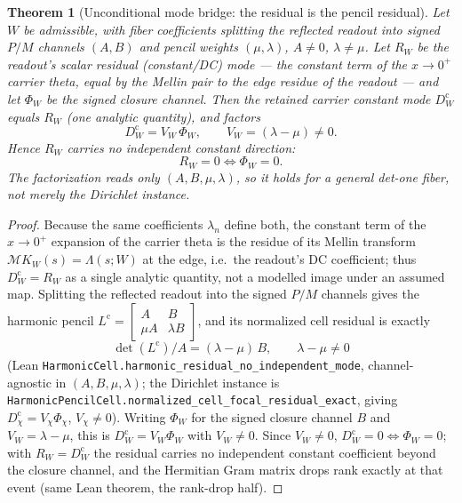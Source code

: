 \documentclass[11pt]{article}
\newtheorem{theorem}{Theorem}
\theoremstyle{definition}
\begin{document}
\begin{theorem}[Unconditional mode bridge: the residual is the pencil residual]\label{thm:g6-mode-bridge}
Let \(W\) be admissible, with fiber coefficients splitting the reflected readout
into signed \(P/M\) channels \((A,B)\) and pencil weights \((\mu,\lambda)\),
\(A\neq0\), \(\lambda\neq\mu\).  Let \(R_W\) be the readout's scalar residual
(constant/DC) mode --- the constant term of the \(x\to0^+\) carrier theta,
equal by the Mellin pair to the edge residue of the readout --- and let
\(\Phi_W\) be the signed closure channel.  Then the retained carrier constant
mode \(D_W^{\mathrm c}\) equals \(R_W\) (one analytic quantity), and factors
\[
D_W^{\mathrm c}=V_W\,\Phi_W,\qquad V_W=(\lambda-\mu)\neq0.
\]
Hence \(R_W\) carries no independent constant direction:
\[
R_W=0\iff \Phi_W=0.
\]
The factorization reads only \((A,B,\mu,\lambda)\), so it holds for a general
det-one fiber, not merely the Dirichlet instance.
\end{theorem}

\begin{proof}
Because the same coefficients \(\lambda_n\) define both, the constant term of
the \(x\to0^+\) expansion of the carrier theta is the residue of its Mellin
transform \(\mathcal M K_W(s)=\Lambda(s;W)\) at the edge, i.e.\ the readout's DC
coefficient; thus \(D_W^{\mathrm c}=R_W\) as a single analytic quantity, not a
modelled image under an assumed map.  Splitting the reflected readout into the
signed \(P/M\) channels gives the harmonic pencil
\(L^{\mathrm c}=\left[\begin{smallmatrix}A&B\\ \mu A&\lambda B\end{smallmatrix}\right]\),
and its normalized cell residual is exactly
\[
\det(L^{\mathrm c})/A=(\lambda-\mu)\,B,\qquad \lambda-\mu\neq0
\]
(Lean \texttt{HarmonicCell.harmonic\_residual\_no\_independent\_mode},
channel-agnostic in \((A,B,\mu,\lambda)\); the Dirichlet instance is
\texttt{HarmonicPencilCell.normalized\_cell\_focal\_residual\_exact}, giving
\(D^{\mathrm c}_\chi=V_\chi\Phi_\chi\), \(V_\chi\neq0\)).  Writing \(\Phi_W\) for
the signed closure channel \(B\) and \(V_W=\lambda-\mu\), this is
\(D_W^{\mathrm c}=V_W\Phi_W\) with \(V_W\neq0\).  Since \(V_W\neq0\),
\(D_W^{\mathrm c}=0\iff\Phi_W=0\); with \(R_W=D_W^{\mathrm c}\) the residual
carries no independent constant coefficient beyond the closure channel, and the
Hermitian Gram matrix drops rank exactly at that event (same Lean theorem, the
rank-drop half).
\end{proof}
\end{document}
